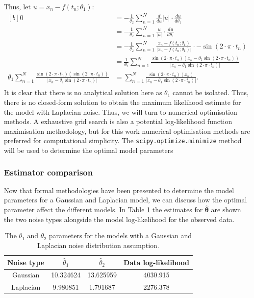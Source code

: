 \documentclass{article}
\begin{document}
Thus, let $u = x_n - f(t_n; \theta_1)$:
\begin{equation}
\begin{aligned}[b]
0 &=- \frac{1}{\theta_2}\sum_{n=1}^{N} \frac{d}{du} \vert u \vert  \cdot \frac{du}{d\theta_1}  \\
&= - \frac{1}{\theta_2}\sum_{n=1}^{N} \frac{u}{\vert u \vert}   \cdot \frac{du}{d\theta_1} \\
&= - \frac{1}{\theta_2}\sum_{n=1}^{N} \frac{x_n - f(t_n; \theta_1)}{\vert x_n - f(t_n; \theta_1) \vert}   \cdot -\sin \left(2 \cdot \pi \cdot t_n \right) \\
&= \frac{1}{\theta_2}\sum_{n=1}^{N} \frac{\sin \left(2 \cdot \pi \cdot t_n \right)\left(x_n - \theta_1 \sin \left(2 \cdot \pi \cdot t_n \right) \right)}{\vert x_n - \theta_1 \sin \left(2 \cdot \pi \cdot t_n \right) \vert} \\
\theta_1 \sum_{n=1}^{N}\frac{\sin \left(2 \cdot \pi \cdot t_n \right)\left( \sin \left(2 \cdot \pi \cdot t_n \right) \right) }{\vert x_n - \theta_1 \sin \left(2 \cdot \pi \cdot t_n \right) \vert} &= \sum_{n=1}^{N}\frac{\sin \left(2 \cdot \pi \cdot t_n \right)\left(x_n \right)}{\vert x_n - \theta_1 \sin \left(2 \cdot \pi \cdot t_n \right) \vert}.\\
\end{aligned}
\end{equation}
It is clear that there is no analytical solution here as $\theta_1$ cannot be isolated. Thus, there is no closed-form solution to obtain the maximum likelihood estimate for the model with Laplacian noise. Thus, we will turn to numerical optimisation methods. A exhaustive grid search is also a potential log-likelihood function maximisation methodology, but  for this work numerical optimisation methods are preferred for computational simplicity. The \texttt{scipy.optimize.minimize} method will be used to determine the optimal model parameters

\subsubsection{Estimator comparison}
Now that formal methodologies have been presented to determine the model parameters for a Gaussian and Laplacian model, we can discuss how the optimal parameter affect the different models. In Table \ref{tab:Q3b_table1} the estimates for $\hat{\boldsymbol\theta}$ are shown the two noise types alongside the model log-likelihood for the observed data. 
\begin{table}[!htb]
\centering
\caption{The $\theta_1$ and $\theta_2$ parameters for the models with a Gaussian and Laplacian noise distribution assumption.}
\label{tab:Q3b_table1}
\begin{tabular}{@{}cccc@{}}
\toprule
Noise type & $\hat{\theta}_1$ & $\hat{\theta}_2$ & Data log-likelihood \\ \midrule
Gaussian & 10.324624 & 13.625959 & 4030.915 \\
Laplacian & 9.980851 & 1.791687 & 2276.378 \\ \bottomrule
\end{tabular}
\end{table}
\end{document}
